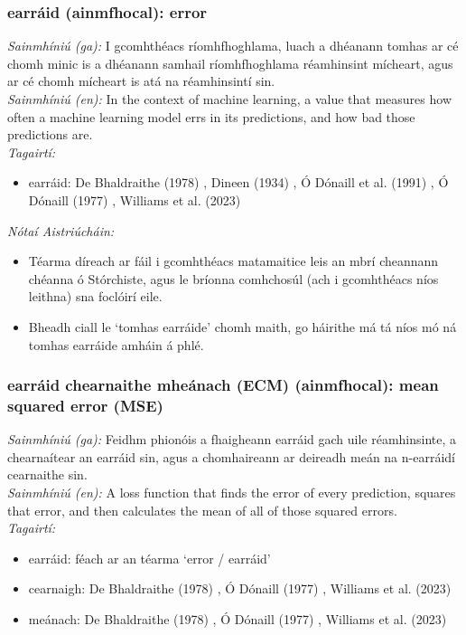 \subsubsection*{earráid (ainmfhocal): error}
 \noindent \textit{Sainmhíniú (ga):} I gcomhthéacs ríomhfhoghlama, luach a dhéanann tomhas ar cé chomh minic is a dhéanann samhail ríomhfhoghlama réamhinsint mícheart, agus ar cé chomh mícheart is atá na réamhinsintí sin.
\\
 \noindent \textit{Sainmhíniú (en):} In the context of machine learning, a value that measures how often a machine learning model errs in its predictions, and how bad those predictions are.
\\
 \noindent \textit{Tagairtí:}
\begin{itemize}
	\item earráid: De Bhaldraithe (1978) \cite{de-bhaldraithe}, Dineen (1934) \cite{dineen}, Ó Dónaill et al. (1991) \cite{focloir-beag}, Ó Dónaill (1977) \cite{odonaill}, Williams et al. (2023) \cite{storchiste}
\end{itemize}

 \noindent \textit{Nótaí Aistriúcháin:}
\begin{itemize}
	\item Téarma díreach ar fáil i gcomhthéacs matamaitice leis an mbrí cheannann chéanna ó Stórchiste, agus le bríonna comhchosúl (ach i gcomhthéacs níos leithna) sna foclóirí eile.
	\item Bheadh ciall le `tomhas earráide' chomh maith, go háirithe má tá níos mó ná tomhas earráide amháin á phlé.
\end{itemize}


\subsubsection*{earráid chearnaithe mheánach (ECM) (ainmfhocal): mean squared error (MSE)}
 \noindent \textit{Sainmhíniú (ga):} Feidhm phionóis a fhaigheann earráid gach uile réamhinsinte, a chearnaítear an earráid sin, agus a chomhaireann ar deireadh meán na n-earráidí cearnaithe sin.
\\
 \noindent \textit{Sainmhíniú (en):} A loss function that finds the error of every prediction, squares that error, and then calculates the mean of all of those squared errors.
\\
 \noindent \textit{Tagairtí:}
\begin{itemize}
	\item earráid: féach ar an téarma `error / earráid'
	\item cearnaigh: De Bhaldraithe (1978) \cite{de-bhaldraithe}, Ó Dónaill (1977) \cite{odonaill}, Williams et al. (2023) \cite{storchiste}
	\item meánach: De Bhaldraithe (1978) \cite{de-bhaldraithe}, Ó Dónaill (1977) \cite{odonaill}, Williams et al. (2023) \cite{storchiste}
\end{itemize}

